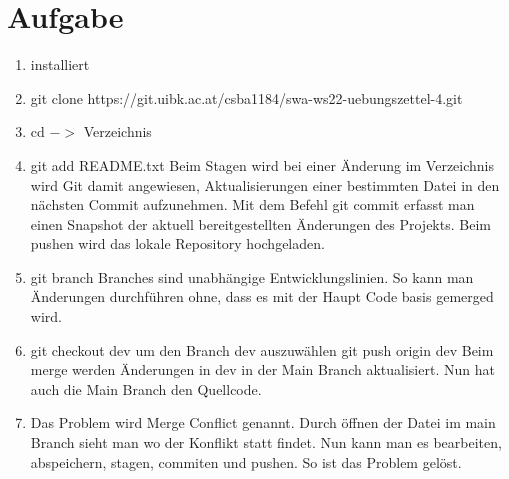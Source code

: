 \documentclass[]{article}
\begin{document}
\section{Aufgabe}
\begin{enumerate}
\item installiert
\item git clone https://git.uibk.ac.at/csba1184/swa-ws22-uebungszettel-4.git
\item cd $->$ Verzeichnis
\item git add README.txt
Beim Stagen wird bei einer Änderung im Verzeichnis wird Git damit angewiesen, Aktualisierungen einer bestimmten Datei in den nächsten Commit aufzunehmen.
Mit dem Befehl git commit erfasst man einen Snapshot der aktuell bereitgestellten Änderungen des Projekts.
Beim pushen wird das lokale Repository hochgeladen.
\item git branch
Branches sind unabhängige Entwicklungslinien. So  kann man Änderungen durchführen ohne, dass es mit der Haupt Code basis gemerged wird.
\item
git checkout dev um den Branch dev auszuwählen 
git push origin dev
Beim merge werden Änderungen in dev in der Main Branch aktualisiert. Nun hat auch die Main Branch den Quellcode.
\item
Das Problem wird Merge Conflict genannt. Durch öffnen der Datei im main Branch sieht man wo der Konflikt statt findet. Nun kann man es bearbeiten, abspeichern, stagen, commiten und pushen. So ist das Problem gelöst.




\end{enumerate}
	
\end{document}
